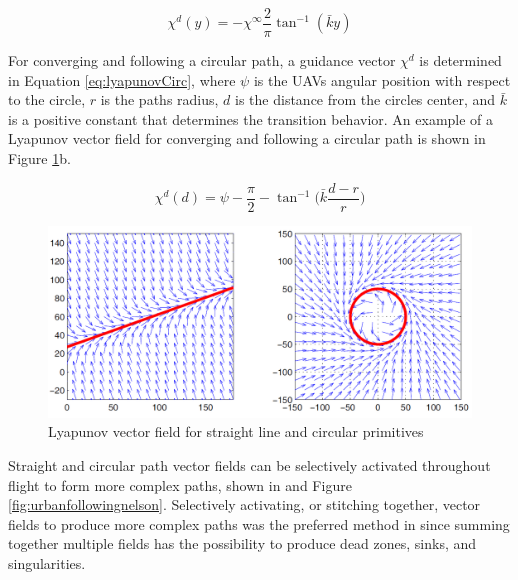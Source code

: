 \documentclass[numbered,pdftex]{ohio-etd}
\begin{document}
\begin{equation}\label{eq:lyapunovStraight}
\chi^d(y) = -\chi^{\infty}\frac{2}{\pi}\tan^{-1}(\bar{k}y)
\end{equation}



For converging and following a circular path, a guidance vector $\chi^{d}$ is determined in Equation \ref{eq:lyapunovCirc}, where $\psi$ is the UAVs angular position with respect to the circle, $r$ is the paths radius, $d$ is the distance from the circles center, and $\bar{k}$ is a positive constant that determines the transition behavior. An example of a Lyapunov vector field for converging and following a circular path is shown in Figure \ref{fig:vfPathPrimitives}b.

\begin{equation}\label{eq:lyapunovCirc}
\chi^d(d) = \psi-\frac{\pi}{2}-\tan^{-1} \bigg(\bar{k} \frac{d-r}{r} \bigg)
\end{equation}


\begin{figure}
	\centering
	\includegraphics[width=13cm]{PaperFigures/nelsonLyapunov}
	\caption{Lyapunov vector field for straight line and circular primitives \cite{nelson_cooperative_2005}}
	\label{fig:vfPathPrimitives}
\end{figure}




Straight and circular path vector fields can be selectively activated throughout flight to form more complex paths, shown in \cite{nelson_cooperative_2005,nelson_vector_2006,nelson_vector_2007,jung_unmanned_2016} and Figure \ref{fig:urbanfollowingnelson}. Selectively activating, or stitching together, vector fields to produce more complex paths was the preferred method in \cite{nelson_cooperative_2005} since summing together multiple fields has the possibility to produce dead zones, sinks, and singularities.
 
\end{document}
